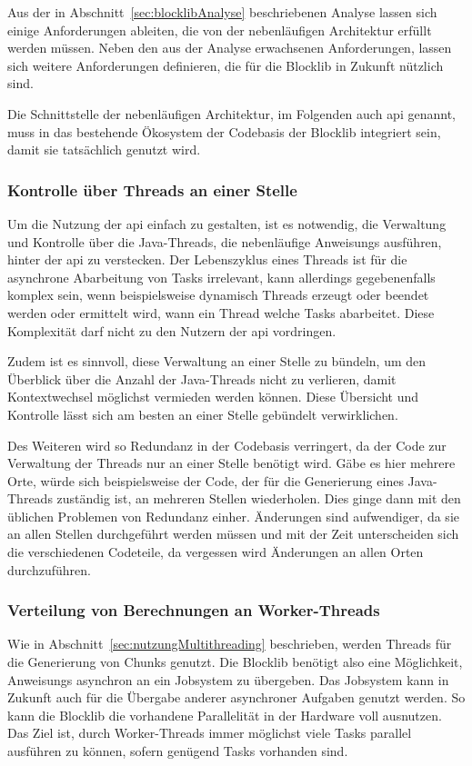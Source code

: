 Aus der in Abschnitt~\ref{sec:blocklibAnalyse} beschriebenen Analyse lassen sich einige Anforderungen ableiten, die von der nebenläufigen Architektur erfüllt werden müssen. Neben den aus der Analyse erwachsenen Anforderungen, lassen sich weitere Anforderungen definieren, die für die Blocklib in Zukunft nützlich sind.

Die Schnittstelle der nebenläufigen Architektur, im Folgenden auch \acs{api} genannt, muss in das bestehende Ökosystem der Codebasis der Blocklib integriert sein, damit sie tatsächlich genutzt wird.

\subsubsection{Kontrolle über Threads an einer Stelle}
Um die Nutzung der \acs{api} einfach zu gestalten, ist es notwendig, die Verwaltung und Kontrolle über die Java-Threads, die nebenläufige \glspl{Anweisung} ausführen, hinter der \acs{api} zu verstecken. Der Lebenszyklus eines Threads ist für die asynchrone Abarbeitung von Tasks irrelevant, kann allerdings gegebenenfalls komplex sein, wenn beispielsweise dynamisch Threads erzeugt oder beendet werden oder ermittelt wird, wann ein Thread welche Tasks abarbeitet. Diese Komplexität darf nicht zu den Nutzern der \acs{api} vordringen.

Zudem ist es sinnvoll, diese Verwaltung an einer Stelle zu bündeln, um den Überblick über die Anzahl der Java-Threads nicht zu verlieren, damit Kontextwechsel möglichst vermieden werden können. Diese Übersicht und Kontrolle lässt sich am besten an einer Stelle gebündelt verwirklichen.

Des Weiteren wird so Redundanz in der Codebasis verringert, da der Code zur Verwaltung der Threads nur an einer Stelle benötigt wird. Gäbe es hier mehrere Orte, würde sich beispielsweise der Code, der für die Generierung eines Java-Threads zuständig ist, an mehreren Stellen wiederholen. Dies ginge dann mit den üblichen Problemen von Redundanz einher. Änderungen sind aufwendiger, da sie an allen Stellen durchgeführt werden müssen und mit der Zeit unterscheiden sich die verschiedenen Codeteile, da vergessen wird Änderungen an allen Orten durchzuführen.

\subsubsection{Verteilung von Berechnungen an Worker-Threads}
Wie in Abschnitt~\ref{sec:nutzungMultithreading} beschrieben, werden Threads für die Generierung von Chunks genutzt. Die Blocklib benötigt also eine Möglichkeit, \glspl{Anweisung} asynchron an ein Jobsystem zu übergeben. Das Jobsystem kann in Zukunft auch für die Übergabe anderer asynchroner Aufgaben genutzt werden. So kann die Blocklib die vorhandene Parallelität in der Hardware voll ausnutzen. Das Ziel ist, durch Worker-Threads immer möglichst viele Tasks parallel ausführen zu können, sofern genügend Tasks vorhanden sind.

